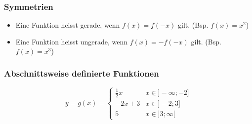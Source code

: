 \documentclass[12pt]{scrartcl}
\begin{document}
\subsubsection{Symmetrien}

\begin{itemize}
    \item Eine Funktion heisst gerade, wenn $f(x) = f(-x)$ gilt. (Bsp. $f(x) = x^2$)
    \item Eine Funktion heisst ungerade, wenn $f(x) = -f(-x)$ gilt. (Bsp. $f(x) = x^3$)
\end{itemize}

\subsubsection{Abschnittsweise definierte Funktionen}

\[ y = g(x) = 
    \begin{cases} 
    \frac{1}{2}x    & x \in ]-\infty; -2] \\
    -2x+3           & x \in ]-2; 3]\\
    5               & x \in ]3;\infty[
 \end{cases}
\]


\begin{center}
\end{center}



% 
\end{document}
